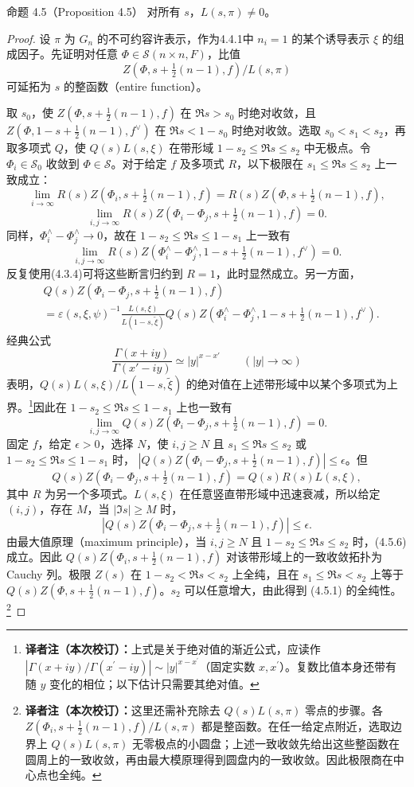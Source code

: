 \begin{originaltheorem}{命题 4.5（Proposition 4.5）}
对所有 $s$，$L(s,\pi)\ne0$。
\end{originaltheorem}
\begin{proof}
设 $\pi$ 为 $G_n$ 的不可约容许表示，作为4.4.1中 $n_i=1$ 的某个诱导表示 $\xi$ 的组成因子。先证明对任意 $\Phi\in\mathcal S(n\times n,F)$，比值
\[
 Z(\Phi,s+\tfrac12(n-1),f)/L(s,\pi)\tag{4.5.1}
\]
可延拓为 $s$ 的整函数（entire function）。

取 $s_0$，使 $Z(\Phi,s+\tfrac12(n-1),f)$ 在 $\Re s>s_0$ 时绝对收敛，且 $Z(\Phi,1-s+\tfrac12(n-1),f^\vee)$ 在 $\Re s<1-s_0$ 时绝对收敛。选取 $s_0<s_1<s_2$，再取多项式 $Q$，使 $Q(s)L(s,\xi)$ 在带形域 $1-s_2\leq\Re s\leq s_2$ 中无极点。令 $\Phi_i\in\mathcal S_0$ 收敛到 $\Phi\in\mathcal S$。对于给定 $f$ 及多项式 $R$，以下极限在 $s_1\leq\Re s\leq s_2$ 上一致成立：
\[
 \lim_{i\to\infty}R(s)Z(\Phi_i,s+\tfrac12(n-1),f)
 =R(s)Z(\Phi,s+\tfrac12(n-1),f),\tag{4.5.2}
\]
\[
 \lim_{i,j\to\infty}R(s)Z(\Phi_i-\Phi_j,s+\tfrac12(n-1),f)=0.\tag{4.5.3}
\]
同样，$\Phi_i^\wedge-\Phi_j^\wedge\longrightarrow0$，故在 $1-s_2\leq\Re s\leq1-s_1$ 上一致有
\[
 \lim_{i,j\to\infty}R(s)Z(\Phi_i^\wedge-\Phi_j^\wedge,
 1-s+\tfrac12(n-1),f^\vee)=0.\tag{4.5.4}
\]
反复使用(4.3.4)可将这些断言归约到 $R=1$，此时显然成立。另一方面，
\begin{align*}
 &Q(s)Z(\Phi_i-\Phi_j,s+\tfrac12(n-1),f)\\
 &=\varepsilon(s,\xi,\psi)^{-1}\frac{L(s,\xi)}{L(1-s,\widetilde\xi)}
 Q(s)Z(\Phi_i^\wedge-\Phi_j^\wedge,1-s+\tfrac12(n-1),f^\vee).
\end{align*}
经典公式
\[
 \frac{\Gamma(x+iy)}{\Gamma(x'-iy)}\simeq |y|^{x-x'}
 \qquad(|y|\longrightarrow\infty)
\]
表明，$Q(s)L(s,\xi)/L(1-s,\widetilde\xi)$ 的绝对值在上述带形域中以某个多项式为上界。\footnote{\textbf{译者注（本次校订）：}上式是关于绝对值的渐近公式，应读作 $|\Gamma(x+iy)/\Gamma(x^{\prime}-iy)|\sim|y|^{x-x^{\prime}}$（固定实数 $x,x^{\prime}$）。复数比值本身还带有随 $y$ 变化的相位；以下估计只需要其绝对值。}因此在 $1-s_2\leq\Re s\leq1-s_1$ 上也一致有
\[
 \lim_{i,j\to\infty}Q(s)Z(\Phi_i-\Phi_j,s+\tfrac12(n-1),f)=0.\tag{4.5.5}
\]
固定 $f$，给定 $\epsilon>0$，选择 $N$，使 $i,j\geq N$ 且 $s_1\leq\Re s\leq s_2$ 或 $1-s_2\leq\Re s\leq1-s_1$ 时，
$|Q(s)Z(\Phi_i-\Phi_j,s+\tfrac12(n-1),f)|\leq\epsilon$。但
\[
 Q(s)Z(\Phi_i-\Phi_j,s+\tfrac12(n-1),f)=Q(s)R(s)L(s,\xi),
\]
其中 $R$ 为另一个多项式。$L(s,\xi)$ 在任意竖直带形域中迅速衰减，所以给定 $(i,j)$，存在 $M$，当 $|\Im s|\geq M$ 时，
\[
 |Q(s)Z(\Phi_i-\Phi_j,s+\tfrac12(n-1),f)|\leq\epsilon.\tag{4.5.6}
\]
由最大值原理（maximum principle），当 $i,j\geq N$ 且 $1-s_2\leq\Re s\leq s_2$ 时，(4.5.6)成立。因此 $Q(s)Z(\Phi_i,s+\tfrac12(n-1),f)$ 对该带形域上的一致收敛拓扑为 Cauchy 列。极限 $Z(s)$ 在 $1-s_2<\Re s<s_2$ 上全纯，且在 $s_1\leq\Re s<s_2$ 上等于 $Q(s)Z(\Phi,s+\tfrac12(n-1),f)$。$s_2$ 可以任意增大，由此得到 (4.5.1) 的全纯性。\footnote{\textbf{译者注（本次校订）：}这里还需补充除去 $Q(s)L(s,\pi)$ 零点的步骤。各 $Z(\Phi_i,s+\tfrac12(n-1),f)/L(s,\pi)$ 都是整函数。在任一给定点附近，选取边界上 $Q(s)L(s,\pi)$ 无零极点的小圆盘；上述一致收敛先给出这些整函数在圆周上的一致收敛，再由最大模原理得到圆盘内的一致收敛。因此极限商在中心点也全纯。}


\end{proof}
